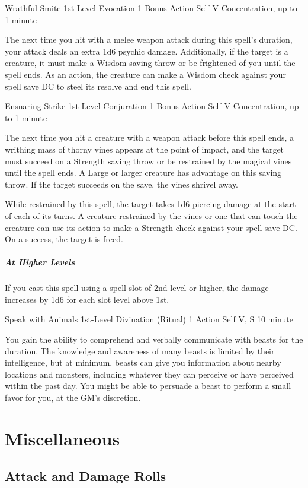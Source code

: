 \documentclass[letterpaper,openany,oneside,twocolumn]{book}
\begin{document}
\DndSpellHeader
  {Wrathful Smite}
  {1st-Level Evocation}
  {1 Bonus Action}
  {Self}
  {V}
  {Concentration, up to 1 minute}

The next time you hit with a melee weapon attack during this spell's duration, your attack deals an extra 1d6 psychic damage. Additionally, if the target is a creature, it must make a Wisdom saving throw or be frightened of you until the spell ends. As an action, the creature can make a Wisdom check against your spell save DC to steel its resolve and end this spell.

\DndSpellHeader
  {Ensnaring Strike}
  {1st-Level Conjuration}
  {1 Bonus Action}
  {Self}
  {V}
  {Concentration, up to 1 minute}

The next time you hit a creature with a weapon attack before this spell ends, a writhing mass of thorny vines appears at the point of impact, and the target must succeed on a Strength saving throw or be restrained by the magical vines until the spell ends. A Large or larger creature has advantage on this saving throw. If the target succeeds on the save, the vines shrivel away.

While restrained by this spell, the target takes 1d6 piercing damage at the start of each of its turns. A creature restrained by the vines or one that can touch the creature can use its action to make a Strength check against your spell save DC. On a success, the target is freed.

\subparagraph*{At Higher Levels} If you cast this spell using a spell slot of 2nd level or higher, the damage increases by 1d6 for each slot level above 1st.

\DndSpellHeader
  {Speak with Animals}
  {1st-Level Divination (Ritual)}
  {1 Action}
  {Self}
  {V, S}
  {10 minute}

You gain the ability to comprehend and verbally communicate with beasts for the duration. The knowledge and awareness of many beasts is limited by their intelligence, but at minimum, beasts can give you information about nearby locations and monsters, including whatever they can perceive or have perceived within the past day. You might be able to persuade a beast to perform a small favor for you, at the GM's discretion.

\section*{Miscellaneous}
\subsection*{Attack and Damage Rolls}
\end{document}
